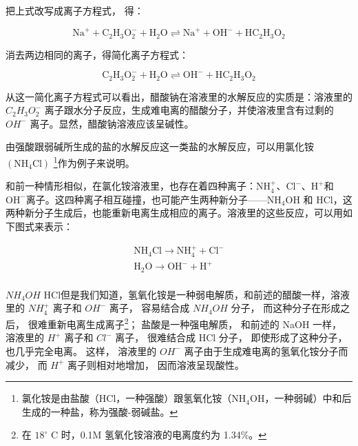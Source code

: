 把上式改写成离子方程式， 得：

\[
\mathrm{Na} ^ {+} + \mathrm{C} _ {2} \mathrm{H} _ {3} \mathrm{O} _ {2} ^ {-} + \mathrm{H} _ {2} \mathrm{O} \rightleftharpoons \mathrm{Na} ^ {+} + \mathrm{OH} ^ {-} + \mathrm{HC} _ {2} \mathrm{H} _ {3} \mathrm{O} _ {2}
\]

消去两边相同的离子，得简化离子方程式：

\[
\mathrm{C} _ {2} \mathrm{H} _ {3} \mathrm{O} _ {2} ^ {-} + \mathrm{H} _ {2} \mathrm{O} \rightleftharpoons \mathrm{OH} ^ {-} + \mathrm{HC} _ {2} \mathrm{H} _ {3} \mathrm{O} _ {2}
\]

从这一简化离子方程式可以看出，醋酸钠在溶液里的水解反应的实质是：溶液里的
\(C_{2}H_{3}O_{2}^{-}\)
离子跟水分子反应，生成难电离的醋酸分子，并使溶液里含有过剩的 \(OH^{-}\)
离子。显然，醋酸钠溶液应该呈碱性。

由强酸跟弱碱所生成的盐的水解反应这一类盐的水解反应，可以用氯化铵
\(\left(\mathrm{NH}_{4}\mathrm{Cl}\right)\) \footnote{氯化铵是由盐酸（HCl，一种强酸）跟氢氧化铵（\(\mathrm{NH_4OH}\)，一种弱碱）中和后生成的一种盐，称为强酸-弱碱盐。}作为例子来说明。

和前一种情形相似，在氯化铵溶液里，也存在着四种离子：\(\mathrm{NH}_{4}^{+}\)、\(\mathrm{Cl}^{-}\)、\(\mathrm{H}^{+}\)和
\(\mathrm{OH}^{-}\)离子。这四种离子相互碰撞，也可能产生两种新分子------\(\mathrm{NH}_{4}\mathrm{OH}\)
和
\(\mathrm{HCl}\)，这两种新分子生成后，也能重新电离生成相应的离子。溶液里的这些反应，可以用如下图式来表示：

\[
\begin{array}{c} \mathrm{NH} _ {4} \mathrm{Cl} \xrightarrow {\text {   }} \mathrm{NH} _ {4} ^ {+} + \mathrm{Cl} ^ {-} \\ \mathrm{H} _ {2} \mathrm{O} \xrightarrow {\text {   }} \mathrm{OH} ^ {-} + \mathrm{H} ^ {+} \\ \text {   } \quad \text {   } \quad \text {   } \quad \text {   } \quad \text {   } \quad \text {   } \end{array}
\]

\(NH_{4}OH\)
HCl但是我们知道，氢氧化铵是一种弱电解质，和前述的醋酸一样，溶液里的
\(NH_{4}^{+}\) 离子和 \(OH^{-}\) 离子， 容易结合成 \(NH_{4}OH\) 分子，
而这种分子在形成之后， 很难重新电离生成离子\footnote{在 \(18^{\circ}\) C
  时，0.1M 氢氧化铵溶液的电离度约为 1.34\%。}； 盐酸是一种强电解质，
和前述的 NaOH 一样， 溶液里的 \(H^{+}\) 离子和 \(Cl^{-}\) 离子，
很难结合成 HCl 分子， 即使形成了这种分子， 也几乎完全电离。 这样，
溶液里的 \(OH^{-}\) 离子由于生成难电离的氢氧化铵分子而减少， 而
\(H^{+}\) 离子则相对地增加， 因而溶液呈现酸性。

